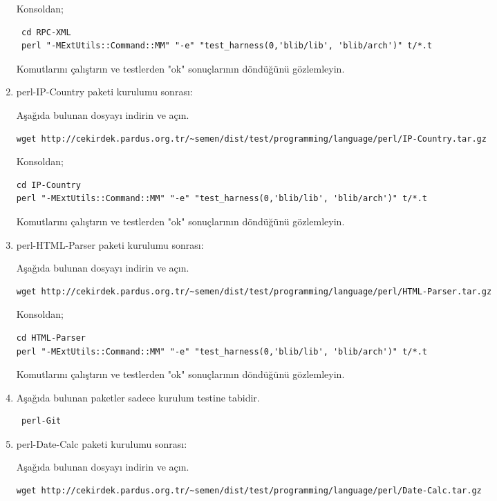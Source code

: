 \documentclass[a4paper,10pt]{article}
\begin{document}
\begin{enumerate}
Konsoldan;
\begin{verbatim}
 cd RPC-XML
 perl "-MExtUtils::Command::MM" "-e" "test_harness(0,'blib/lib', 'blib/arch')" t/*.t
\end{verbatim}

Komutlarını çalıştırın ve testlerden "ok" sonuçlarının döndüğünü gözlemleyin.

\item perl-IP-Country paketi kurulumu sonrası:

Aşağıda bulunan dosyayı indirin ve açın.
\begin{verbatim}
wget http://cekirdek.pardus.org.tr/~semen/dist/test/programming/language/perl/IP-Country.tar.gz
\end{verbatim}

Konsoldan;
\begin{verbatim}
cd IP-Country
perl "-MExtUtils::Command::MM" "-e" "test_harness(0,'blib/lib', 'blib/arch')" t/*.t
\end{verbatim}

Komutlarını çalıştırın ve testlerden "ok" sonuçlarının döndüğünü gözlemleyin.

\item perl-HTML-Parser paketi kurulumu sonrası:

Aşağıda bulunan dosyayı indirin ve açın.
\begin{verbatim}
wget http://cekirdek.pardus.org.tr/~semen/dist/test/programming/language/perl/HTML-Parser.tar.gz
\end{verbatim}

Konsoldan;
\begin{verbatim}
cd HTML-Parser
perl "-MExtUtils::Command::MM" "-e" "test_harness(0,'blib/lib', 'blib/arch')" t/*.t
\end{verbatim}

Komutlarını çalıştırın ve testlerden "ok" sonuçlarının döndüğünü gözlemleyin.

\item Aşağıda bulunan paketler sadece kurulum testine tabidir.
\begin{verbatim}
 perl-Git
\end{verbatim}

\item perl-Date-Calc paketi kurulumu sonrası:

Aşağıda bulunan dosyayı indirin ve açın.
\begin{verbatim}
wget http://cekirdek.pardus.org.tr/~semen/dist/test/programming/language/perl/Date-Calc.tar.gz
\end{verbatim}


\end{enumerate}
\end{document}
